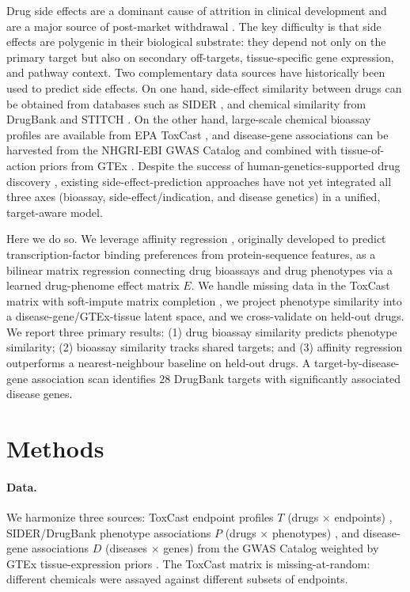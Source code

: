 \documentclass[11pt]{article}
\begin{document}
Drug side effects are a dominant cause of attrition in clinical development and are a major source of post-market withdrawal \cite{campillos2008side,lounkine2012large}. The key difficulty is that side effects are polygenic in their biological substrate: they depend not only on the primary target but also on secondary off-targets, tissue-specific gene expression, and pathway context. Two complementary data sources have historically been used to predict side effects. On one hand, side-effect similarity between drugs can be obtained from databases such as SIDER \cite{kuhn2016sider}, and chemical similarity from DrugBank \cite{wishart2018drugbank} and STITCH \cite{szklarczyk2016stitch}. On the other hand, large-scale chemical bioassay profiles are available from EPA ToxCast \cite{kavlock2012toxcast,tice2013improving}, and disease-gene associations can be harvested from the NHGRI-EBI GWAS Catalog \cite{buniello2019gwas,wagner2016gwascatalog} and combined with tissue-of-action priors from GTEx \cite{gtex2020}. Despite the success of human-genetics-supported drug discovery \cite{nelson2015drug,king2019drugindication,claussnitzer2020brief}, existing side-effect-prediction approaches have not yet integrated all three axes (bioassay, side-effect/indication, and disease genetics) in a unified, target-aware model.

Here we do so. We leverage affinity regression \cite{pelossof2015affinity}, originally developed to predict transcription-factor binding preferences from protein-sequence features, as a bilinear matrix regression connecting drug bioassays and drug phenotypes via a learned drug-phenome effect matrix $E$. We handle missing data in the ToxCast matrix with soft-impute matrix completion \cite{mazumder2010softimpute}, we project phenotype similarity into a disease-gene/GTEx-tissue latent space, and we cross-validate on held-out drugs. We report three primary results: (1) drug bioassay similarity predicts phenotype similarity; (2) bioassay similarity tracks shared targets; and (3) affinity regression outperforms a nearest-neighbour baseline on held-out drugs. A target-by-disease-gene association scan identifies $28$ DrugBank targets with significantly associated disease genes.

\section{Methods}

\paragraph{Data.} We harmonize three sources: ToxCast endpoint profiles $T$ (drugs $\times$ endpoints) \cite{kavlock2012toxcast,tice2013improving}, SIDER/DrugBank phenotype associations $P$ (drugs $\times$ phenotypes) \cite{kuhn2016sider,wishart2018drugbank}, and disease-gene associations $D$ (diseases $\times$ genes) from the GWAS Catalog \cite{buniello2019gwas,wagner2016gwascatalog} weighted by GTEx tissue-expression priors \cite{gtex2020}. The ToxCast matrix is missing-at-random: different chemicals were assayed against different subsets of endpoints.
\end{document}
